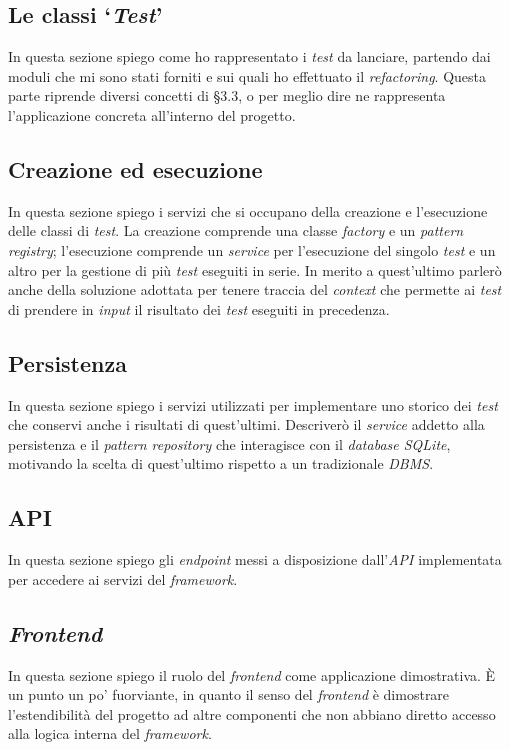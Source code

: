 \subsection{Le classi `\textit{Test}'} \label{dev:classi_test}
\noindent
In questa sezione spiego come ho rappresentato i \textit{test} da lanciare, partendo dai moduli che mi sono stati forniti e sui quali ho effettuato il \textit{refactoring}.
Questa parte riprende diversi concetti di §3.3, o per meglio dire ne rappresenta l'applicazione concreta all'interno del progetto.

\subsection{Creazione ed esecuzione}
\noindent
In questa sezione spiego i servizi che si occupano della creazione e l'esecuzione delle classi di \textit{test}.
La creazione comprende una classe \textit{factory} e un \textit{pattern registry}; l'esecuzione comprende un \textit{service} per l'esecuzione del singolo \textit{test} e un altro per la gestione di più \textit{test} eseguiti in serie.
In merito a quest'ultimo parlerò anche della soluzione adottata per tenere traccia del \textit{context} che permette ai \textit{test} di prendere in \textit{input} il risultato dei \textit{test} eseguiti in precedenza.

\subsection{Persistenza}
\noindent
In questa sezione spiego i servizi utilizzati per implementare uno storico dei \textit{test} che conservi anche i risultati di quest'ultimi.
Descriverò il \textit{service} addetto alla persistenza e il \textit{pattern repository} che interagisce con il \textit{database SQLite}, motivando la scelta di quest'ultimo rispetto a un tradizionale \textit{DBMS}.

\subsection{API}\label{dev:api}
\noindent
In questa sezione spiego gli \textit{endpoint} messi a disposizione dall'\textit{API} implementata per accedere ai servizi del \textit{framework}.

\subsection{\textit{Frontend} }
\noindent
In questa sezione spiego il ruolo del \textit{frontend} come applicazione dimostrativa.
È un punto un po' fuorviante, in quanto il senso del \textit{frontend} è dimostrare l'estendibilità del progetto ad altre componenti che non abbiano diretto accesso alla logica interna del \textit{framework}.

